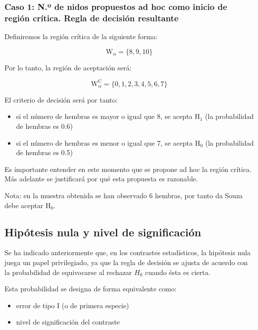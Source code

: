 \documentclass[
]{article}
\providecommand{\tightlist}{%
  \setlength{\itemsep}{0pt}\setlength{\parskip}{0pt}}
\begin{document}
\subsubsection{Caso 1: N.º de nidos propuestos ad hoc como inicio de región crítica. Regla de decisión resultante}\label{caso-1-n.uxba-de-nidos-propuestos-ad-hoc-como-inicio-de-regiuxf3n-cruxedtica.-regla-de-decisiuxf3n-resultante}

Definiremos la región crítica de la siguiente forma:

\[
\mathrm{W}_{\alpha}=\{8,9,10\}
\]

Por lo tanto, la región de aceptación será:

\[
\mathrm{W}_{\alpha}^{\mathrm{C}}=\{0,1,2,3,4,5,6,7\}
\]

El criterio de decisión será por tanto:

\begin{itemize}
\tightlist
\item
  si el número de hembras es mayor o igual que 8, se acepta \(\mathrm{H}_{1}\) (la probabilidad de hembras es 0.6)\\
\item
  si el número de hembras es menor o igual que 7, se acepta \(\mathrm{H}_{0}\) (la probabilidad de hembras es 0.5)
\end{itemize}

Es importante entender en este momento que se propone ad hoc la región crítica. Más adelante se justificará por qué esta propuesta es razonable.

Nota: en la muestra obtenida se han observado 6 hembras, por tanto da Souza debe aceptar \(\mathrm{H}_{0}\).

\subsection{Hipótesis nula y nivel de significación}\label{hipuxf3tesis-nula-y-nivel-de-significaciuxf3n}

Se ha indicado anteriormente que, en los contrastes estadísticos, la hipótesis nula juega un papel privilegiado, ya que la regla de decisión se ajusta de acuerdo con la probabilidad de equivocarse al rechazar \(H_{0}\) cuando ésta es cierta.

Esta probabilidad se designa de forma equivalente como:

\begin{itemize}
\tightlist
\item
  error de tipo I (o de primera especie)\\
\item
  nivel de significación del contraste
\end{itemize}
\end{document}
